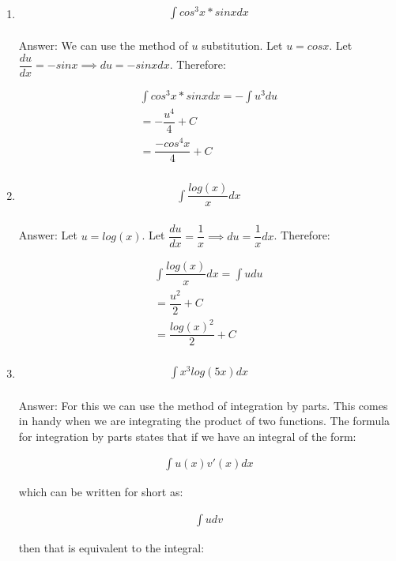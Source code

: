 \documentclass[12pt]{article}
\begin{document}
\begin{enumerate}
\item
\begin{align*}
\int cos^3x* sin x dx\\
\end{align*}

\medskip

Answer: We can use the method of $u$ substitution. Let $u=cos x$. Let $\dfrac{du}{dx} = -sinx \implies du=-sinx dx$. Therefore:

\begin{align*}
\int cos^3 x *sinx dx = -\int u^3 du  \\
= -\dfrac{u^4}{ 4} + C\\
= \dfrac{-cos^4x}{ 4}+ C\\
\end{align*}

\item 
\begin{align*}
\int \dfrac{log(x)}{x} dx\\
\end{align*}

Answer: Let $u=log(x)$. Let $\dfrac{du}{dx} = \dfrac{1}{x} \implies du= \dfrac{1}{x}  dx$. Therefore:

\begin{align*}
\int \dfrac{log(x)}{x} dx = \int u du  \\
= \dfrac{u^2}{ 2} + C\\
= \dfrac{log(x)^2}{ 2}+ C\\
\end{align*}


\item 
\begin{align*}
\int  x^3log(5x) dx\\
\end{align*}

Answer: For this we can use the method of integration by parts. This comes in handy when we are integrating the product of two functions. The formula for integration by parts states that if we have an integral of the form:

\begin{align*}
\int u(x)v'(x) dx
\end{align*}

which can be written for short as:


\begin{align*}
\int u dv
\end{align*}

then that is equivalent to the integral:


\end{enumerate}
\end{document}
